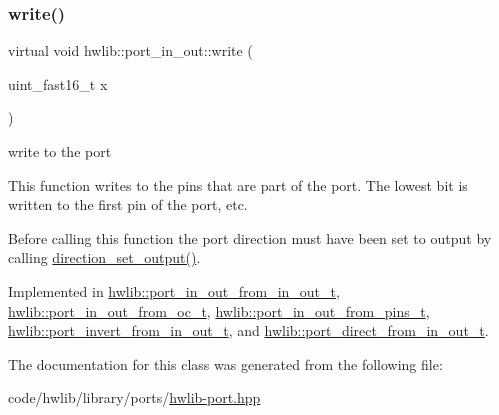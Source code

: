 \mbox{\label{classhwlib_1_1port__in__out_a0019c1f35d6f7b1d3ace6b22da86ecec}} 
\subsubsection{\texorpdfstring{write()}{write()}}
{\footnotesize\ttfamily virtual void hwlib\+::port\+\_\+in\+\_\+out\+::write (\begin{DoxyParamCaption}\item[{uint\+\_\+fast16\+\_\+t}]{x }\end{DoxyParamCaption})\hspace{0.3cm}{\ttfamily [pure virtual]}}

write to the port

This function writes to the pins that are part of the port. The lowest bit is written to the first pin of the port, etc.

Before calling this function the port direction must have been set to output by calling \hyperlink{classhwlib_1_1port__in__out_a515b4a6bbde4f2df5bb11cda41234fe4}{direction\+\_\+set\+\_\+output()}. 

Implemented in \hyperlink{classhwlib_1_1port__in__out__from__in__out__t_acf0e3831b73a125fed1bbf6e9986551c}{hwlib\+::port\+\_\+in\+\_\+out\+\_\+from\+\_\+in\+\_\+out\+\_\+t}, \hyperlink{classhwlib_1_1port__in__out__from__oc__t_a47f3cada1694544f728d33f85918a806}{hwlib\+::port\+\_\+in\+\_\+out\+\_\+from\+\_\+oc\+\_\+t}, \hyperlink{classhwlib_1_1port__in__out__from__pins__t_a38b742fa3bcaa474b5beaeb71a5c364a}{hwlib\+::port\+\_\+in\+\_\+out\+\_\+from\+\_\+pins\+\_\+t}, \hyperlink{classhwlib_1_1port__invert__from__in__out__t_add95d20973a18e012ff97988e49aeff4}{hwlib\+::port\+\_\+invert\+\_\+from\+\_\+in\+\_\+out\+\_\+t}, and \hyperlink{classhwlib_1_1port__direct__from__in__out__t_a952b994b4b4793590252781686468e48}{hwlib\+::port\+\_\+direct\+\_\+from\+\_\+in\+\_\+out\+\_\+t}.



The documentation for this class was generated from the following file\+:\begin{DoxyCompactItemize}
\item 
code/hwlib/library/ports/\hyperlink{hwlib-port_8hpp}{hwlib-\/port.\+hpp}\end{DoxyCompactItemize}
